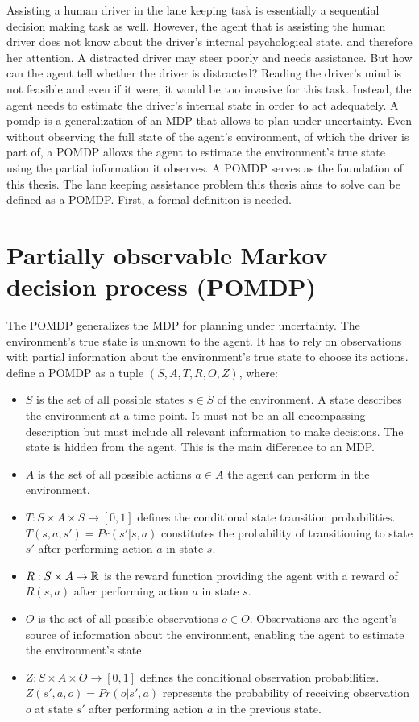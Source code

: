Assisting a human driver in the lane keeping task is essentially a sequential decision making task as well. However, the agent that is assisting the human driver does not know about the driver's internal psychological state, and therefore her attention. A distracted driver may steer poorly and needs assistance. But how can the agent tell whether the driver is distracted? Reading the driver's mind is not feasible and even if it were, it would be too invasive for this task. Instead, the agent needs to estimate the driver's internal state in order to act adequately. A \Gls{pomdp} is a generalization of an MDP that allows to plan under uncertainty. Even without observing the full state of the agent's environment, of which the driver is part of, a POMDP allows the agent to estimate the environment's true state using the partial information it observes. A POMDP serves as the foundation of this thesis. The lane keeping assistance problem this thesis aims to solve can be defined as a POMDP. First, a formal definition is needed.

\section{Partially observable Markov decision process (POMDP)}
\label{sec:pomdp}

The POMDP generalizes the MDP for planning under uncertainty. The environment's true state is unknown to the agent. It has to rely on observations with partial information about the environment's true state to choose its actions. \cite{pomdp-definition} define a POMDP as a tuple $(S, A, T, R, O, Z)$, where:
\begin{itemize}
    \item $S$ is the set of all possible states $s \in S$ of the environment. A state describes the environment at a time point. It must not be an all-encompassing description but must include all relevant information to make decisions. The state is hidden from the agent. This is the main difference to an MDP.
    \item $A$ is the set of all possible actions $a \in A$ the agent can perform in the environment.
    \item $T : S \times A \times S \rightarrow [0,1]$ defines the conditional state transition probabilities. $T(s,a,s') = Pr(s' | s, a)$ constitutes the probability of transitioning to state $s'$ after performing action $a$ in state $s$.
    \item $R : S \times A \rightarrow \mathbb{R}$ is the reward function providing the agent with a reward of $R(s,a)$ after performing action $a$ in state $s$.
    \item $O$ is the set of all possible observations $o \in O$. Observations are the agent's source of information about the environment, enabling the agent to estimate the environment's state.
    \item $Z : S \times A \times O \rightarrow [0,1]$ defines the conditional observation probabilities. $Z(s', a, o) = Pr(o | s', a)$ represents the probability of receiving observation $o$ at state $s'$ after performing action $a$ in the previous state. 
\end{itemize}


